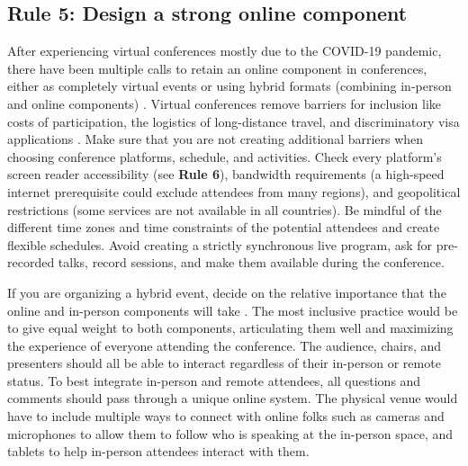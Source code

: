 \documentclass[10pt,letterpaper]{article}
\begin{document}
\subsection*{Rule 5: Design a strong online component} 
\label{rule_online}

After experiencing virtual conferences mostly due to the COVID-19 pandemic, there have been multiple calls to retain an online component in conferences, either as completely virtual events or using hybrid formats (combining in-person and online components) \cite{jooKeepOnlineOption2021, woolstonLearningLoveVirtual2020, ninerBetterWhomLeveling2021, roosOnlineConferencesNew2020, levitisCenteringInclusivityDesign2021, sarabipourChangingScientificMeetings2021}.
Virtual conferences remove barriers for inclusion like costs of participation, the logistics of long-distance travel, and discriminatory visa applications \cite{jooKeepOnlineOption2021, ninerBetterWhomLeveling2021, salibaGettingGripsOnline2020, gichoraTenSimpleRules2010a}. 
Make sure that you are not creating additional barriers when choosing conference platforms, schedule, and activities. 
Check every platform's screen reader accessibility (see \textbf{Rule 6}), bandwidth requirements (a high-speed internet prerequisite could exclude attendees from many regions), and geopolitical restrictions (some services are not available in all countries).
Be mindful of the different time zones and time constraints of the potential attendees and create flexible schedules.
Avoid creating a strictly synchronous live program, ask for pre-recorded talks, record sessions, and make them available during the conference.

If you are organizing a hybrid event, decide on the relative importance that the online and in-person components will take \cite{bajpai_towards_2021}. The most inclusive practice would be to give equal weight to both components, articulating them well and maximizing the experience of everyone attending the conference.
The audience, chairs, and presenters should all be able to interact regardless of their in-person or remote status. 
To best integrate in-person and remote attendees, all questions and comments should pass through a unique online system. 
The physical venue would have to include multiple ways to connect with online folks such as cameras and microphones to allow them to follow who is speaking at the in-person space, and tablets to help in-person attendees interact with them.
\end{document}
